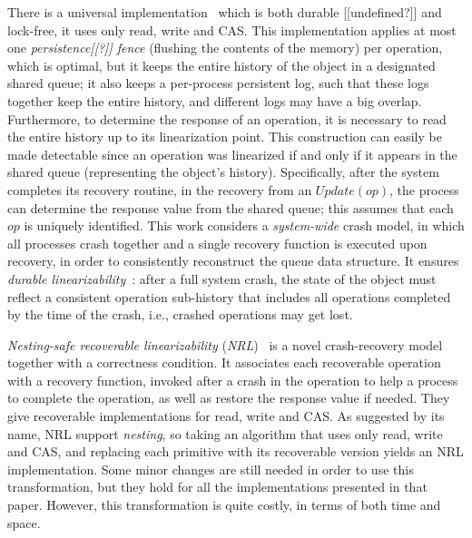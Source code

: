 There is a universal implementation~\cite{DBLP:journals/pacmpl/CohenFL17}
which is both durable [[undefined?]] and lock-free,
it uses only read, write and CAS.
This implementation applies at most one \emph{persistence[[?]] fence}
(flushing the contents of the memory) per operation, which is optimal,
but it keeps the entire history of the object in a designated shared queue;
it also keeps a per-process persistent log, such that these logs together
keep the entire history, and different logs may have a big overlap.
Furthermore, to determine the response of an operation,
it is necessary to read the entire history up to its linearization point.
This construction can easily be made detectable since an operation was
linearized if and only if it appears in the shared queue
(representing the object's history).
Specifically, after the system completes its recovery routine,
in the recovery from an $Update(op)$, 
the process can determine the response value from the shared queue;
this assumes that each $op$ is uniquely identified.
This work considers a \emph{system-wide} crash model, in which
all processes crash together and a single recovery function is
executed upon recovery,
in order to consistently reconstruct the queue data structure.
It ensures \emph{durable linearizability}~\cite{VenkataramanTRC-FAST2011}:
after a full system crash, the state of the object must reﬂect a consistent operation
sub-history that includes all operations completed by the time of the crash,
i.e., crashed operations may get lost.

\emph{Nesting-safe recoverable linearizability} (\emph{NRL})~\cite{AttiyaBH-PODC2018}
is a novel crash-recovery model together with a correctness condition.
It associates each recoverable operation with a recovery function, invoked 
after a crash in the operation to help a process to complete the operation, 
as well as restore the response value if needed.
They give recoverable implementations for read, write and CAS.
As suggested by its name, NRL support \emph{nesting},
so taking an algorithm that uses only read, write and CAS,
and replacing each primitive with its recoverable version yields an NRL implementation.
Some minor changes are still needed in order to use this transformation,
but they hold for all the implementations presented in that paper.
However, this transformation is quite costly, in terms of both time and space.

